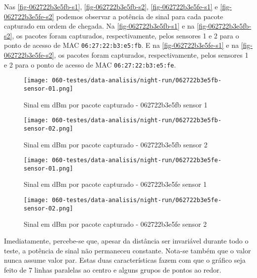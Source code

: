 Nas \autoref{fig-062722b3e5fb-s1}, \autoref{fig-062722b3e5fb-s2},
\autoref{fig-062722b3e5fe-s1} e \autoref{fig-062722b3e5fe-s2} podemos observar
a potência de sinal para cada pacote capturado em ordem de chegada.
Na \autoref{fig-062722b3e5fb-s1} e
na \autoref{fig-062722b3e5fb-s2}, os pacotes
foram capturados, respectivamente, pelos sensores 1 e 2 para o ponto de acesso
de MAC \texttt{06:27:22:b3:e5:fb}. E na
\autoref{fig-062722b3e5fe-s1} e na \autoref{fig-062722b3e5fe-s2}, os pacotes foram capturados, respectivamente, pelos sensores 1 e 2 para
o ponto de acesso de MAC \texttt{06:27:22:b3:e5:fe}.

\begin{figure}[htb]
	\centering
	\caption{\label{fig-062722b3e5fb-s1}Sinal em dBm por pacote capturado - 062722b3e5fb sensor 1}
	\texttt{[image: 060-testes/data-analisis/night-run/062722b3e5fb-sensor-01.png]}
\end{figure}

\begin{figure}[htb]
	\centering
	\caption{\label{fig-062722b3e5fb-s2}Sinal em dBm por pacote capturado - 062722b3e5fb sensor 2}
	\texttt{[image: 060-testes/data-analisis/night-run/062722b3e5fb-sensor-02.png]}
\end{figure}

\begin{figure}[htb]
	\centering
	\caption{\label{fig-062722b3e5fe-s1}Sinal em dBm por pacote capturado - 062722b3e5fe sensor 1}
	\texttt{[image: 060-testes/data-analisis/night-run/062722b3e5fe-sensor-01.png]}
\end{figure}

\begin{figure}[htb]
	\centering
	\caption{\label{fig-062722b3e5fe-s2}Sinal em dBm por pacote capturado - 062722b3e5fe sensor 2}
	\texttt{[image: 060-testes/data-analisis/night-run/062722b3e5fe-sensor-02.png]}
\end{figure}

\clearpage

Imediatamente, percebe-se que, apesar da distância ser invariável durante todo o
teste, a potência de sinal
não permaneceu constante. Nota-se também que o valor
nunca assume valor par. Estas duas características fazem com que o gráfico
seja feito de 7 linhas paralelas ao centro e alguns grupos de pontos ao redor.

